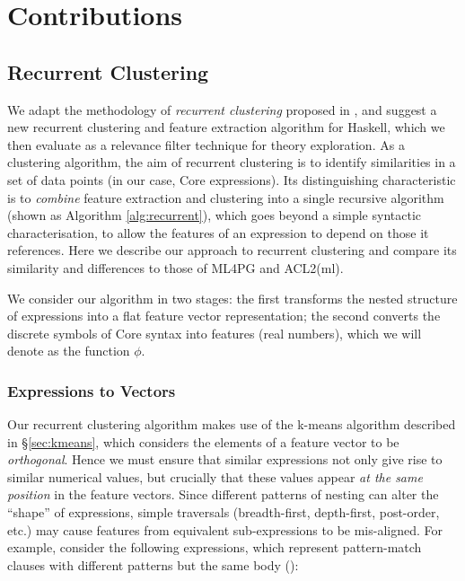 \section{Contributions}
\label{sec:contributions}

\subsection{Recurrent Clustering}
\label{sec:recurrentclustering}

We adapt the methodology of \emph{recurrent clustering} proposed in \cite{DBLP:journals/corr/HerasK14, heras2013proof}, and suggest a new recurrent clustering and feature extraction algorithm for Haskell, which we then evaluate as a relevance filter technique for theory exploration. As a clustering algorithm, the aim of recurrent clustering is to identify similarities in a set of data points (in our case, Core expressions). Its distinguishing characteristic is to \emph{combine} feature extraction and clustering into a single recursive algorithm (shown as Algorithm \ref{alg:recurrent}), which goes beyond a simple syntactic characterisation, to allow the features of an expression to depend on those it references. Here we describe our approach to recurrent clustering and compare its similarity and differences to those of ML4PG and ACL2(ml).

We consider our algorithm in two stages: the first transforms the nested structure of expressions into a flat feature vector representation; the second converts the discrete symbols of Core syntax into features (real numbers), which we will denote as the function $\phi$.

\subsubsection{Expressions to Vectors}
\label{sec:expressionstovectors}

Our recurrent clustering algorithm makes use of the k-means algorithm described in \S \ref{sec:kmeans}, which considers the elements of a feature vector to be \emph{orthogonal}. Hence we must ensure that similar expressions not only give rise to similar numerical values, but crucially that these values appear \emph{at the same position} in the feature vectors. Since different patterns of nesting can alter the ``shape'' of expressions, simple traversals (breadth-first, depth-first, post-order, etc.) may cause features from equivalent sub-expressions to be mis-aligned. For example, consider the following expressions, which represent pattern-match clauses with different patterns but the same body ():

